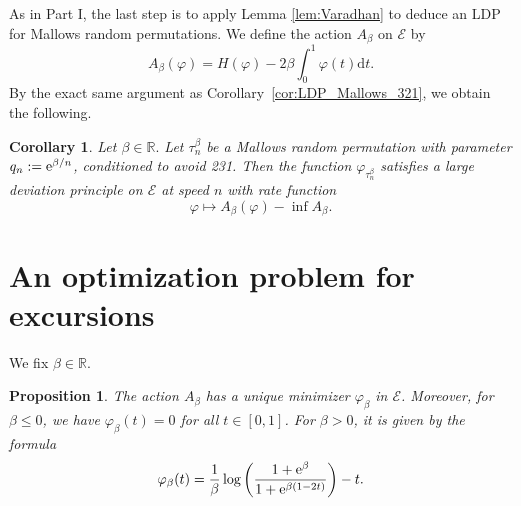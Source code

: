 \documentclass[a4paper,11pt]{amsart}
\newcommand{\ee}{\textup{e}}
\newcommand{\R}{\mathbb R}
\newtheorem{prop}[thm]{Proposition}
\newtheorem{cor}[thm]{Corollary}
\theoremstyle{definition}
\begin{document}
As in Part I, the last step is to apply Lemma \ref{lem:Varadhan} to deduce an LDP for Mallows random permutations. 
We define the action $A_{\beta}$ on $\mathcal E$ by
\[ A_{\beta}(\varphi) = H(\varphi) - 2 \beta \int_0^1  \varphi(t)  \mathrm{d}t. \]
By the exact same argument as Corollary~\ref{cor:LDP_Mallows_321}, we obtain the following.

\begin{cor}\label{cor:LDP_Mallows_231}
     Let $\beta\in \mathbb R.$  Let $\tau_n^\beta$ be a Mallows random permutation
     with parameter $q_n := \ee^{\beta/n}$, conditioned to avoid 231.
     Then the function $\varphi_{\tau_n^{\beta}}$ satisfies a large deviation principle on $\mathcal E$ at speed $n$ with rate function
     \[\varphi \mapsto A_\beta (\varphi) - \inf A_\beta.\]
\end{cor}


\section{An optimization problem for excursions}

We fix $\beta \in \R$.
\begin{prop}\label{prop:opti_problem_231}
	The action $A_{\beta}$ has a unique minimizer $\varphi_\beta$ in $\mathcal{E}$. 
    Moreover, for $\beta \leq 0$, we have $\varphi_{\beta}(t)=0$ for all $t \in [0,1]$. 
    For $\beta>0$, it is given by the formula
	\begin{equation}\label{eqn:defn_phi_beta}
		\varphi_\beta(t)= \frac{1}{\beta} \log\left( \frac{ 1 + \ee^{\beta} }{ 1 + \ee^{\beta(1-2t)}} \right) - t.
	\end{equation}
\end{prop}
\end{document}
